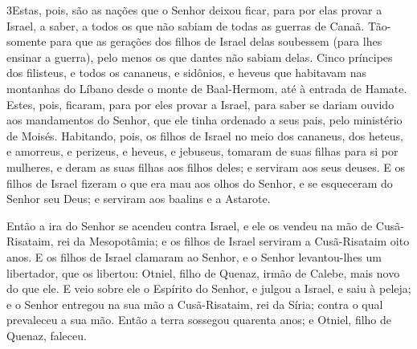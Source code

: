 \medskip

\lettrine{3} Estas, pois, são as nações que o Senhor deixou
ficar, para por elas provar a Israel, a saber, a todos os que não
sabiam de todas as guerras de Canaã. Tão-somente para que as
gerações dos filhos de Israel delas soubessem (para lhes ensinar a
guerra), pelo menos os que dantes não sabiam delas. Cinco
príncipes dos filisteus, e todos os cananeus, e sidônios, e heveus
que habitavam nas montanhas do Líbano desde o monte de Baal-Hermom,
até à entrada de Hamate. Estes, pois, ficaram, para por eles
provar a Israel, para saber se dariam ouvido aos mandamentos do
Senhor, que ele tinha ordenado a seus pais, pelo ministério de
Moisés. Habitando, pois, os filhos de Israel no meio dos
cananeus, dos heteus, e amorreus, e perizeus, e heveus, e jebuseus,
tomaram de suas filhas para si por mulheres, e deram as suas
filhas aos filhos deles; e serviram aos seus deuses. E os filhos
de Israel fizeram o que era mau aos olhos do Senhor, e se esqueceram
do Senhor seu Deus; e serviram aos baalins e a Astarote.

Então a ira do Senhor se acendeu contra Israel, e ele os vendeu na
mão de Cusã-Risataim, rei da Mesopotâmia; e os filhos de Israel
serviram a Cusã-Risataim oito anos. E os filhos de Israel
clamaram ao Senhor, e o Senhor levantou-lhes um libertador, que os
libertou: Otniel, filho de Quenaz, irmão de Calebe, mais novo do que
ele. E veio sobre ele o Espírito do Senhor, e julgou a
Israel, e saiu à peleja; e o Senhor entregou na sua mão a
Cusã-Risataim, rei da Síria; contra o qual prevaleceu a sua mão.
Então a terra sossegou quarenta anos; e Otniel, filho de
Quenaz, faleceu.

